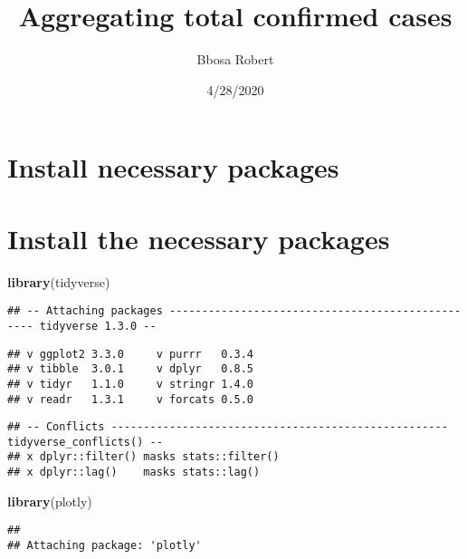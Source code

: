 \documentclass[
]{article}
\title{Aggregating total confirmed cases}
\author{Bbosa Robert}
\date{4/28/2020}
\newenvironment{Shaded}{\begin{snugshade}}{\end{snugshade}}
\newcommand{\KeywordTok}[1]{\textcolor[rgb]{0.13,0.29,0.53}{\textbf{#1}}}
\newcommand{\NormalTok}[1]{#1}
\begin{document}
\maketitle

{
\setcounter{tocdepth}{2}
\tableofcontents
}
\hypertarget{install-necessary-packages}{%
\section{Install necessary packages}\label{install-necessary-packages}}

\hypertarget{install-the-necessary-packages}{%
\section{Install the necessary
packages}\label{install-the-necessary-packages}}

\begin{Shaded}
\begin{Highlighting}[]
\KeywordTok{library}\NormalTok{(tidyverse)}
\end{Highlighting}
\end{Shaded}

\begin{verbatim}
## -- Attaching packages ------------------------------------------------- tidyverse 1.3.0 --
\end{verbatim}

\begin{verbatim}
## v ggplot2 3.3.0     v purrr   0.3.4
## v tibble  3.0.1     v dplyr   0.8.5
## v tidyr   1.1.0     v stringr 1.4.0
## v readr   1.3.1     v forcats 0.5.0
\end{verbatim}

\begin{verbatim}
## -- Conflicts ---------------------------------------------------- tidyverse_conflicts() --
## x dplyr::filter() masks stats::filter()
## x dplyr::lag()    masks stats::lag()
\end{verbatim}

\begin{Shaded}
\begin{Highlighting}[]
\KeywordTok{library}\NormalTok{(plotly)}
\end{Highlighting}
\end{Shaded}

\begin{verbatim}
## 
## Attaching package: 'plotly'
\end{verbatim}
\end{document}
